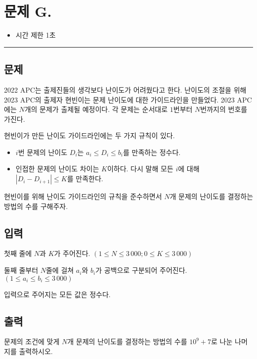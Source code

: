 \newpage
\section*{{\Large 문제 G.} }

\begin{itemize}
    \item 시간 제한 \tabto{2cm} 1초
\end{itemize}

\hrule

\subsection*{문제}

2022 APC는 출제진들의 생각보다 난이도가 어려웠다고 한다. 난이도의 조절을 위해 2023 APC의 출제자 현빈이는 문제 난이도에 대한 가이드라인을 만들었다. 2023 APC에는 $N$개의 문제가 출제될 예정이다. 각 문제는 순서대로 $1$번부터 $N$번까지의 번호를 가진다.

현빈이가 만든 난이도 가이드라인에는 두 가지 규칙이 있다.

\begin{itemize}
    \item $i$번 문제의 난이도 $D_{i}$는 $a_{i}\leq D_{i}\leq b_{i}$를 만족하는 정수다.
    \item 인접한 문제의 난이도 차이는 $K$이하다. 다시 말해 모든 $i$에 대해 $|D_{i}-D_{i+1}|\leq K$를 만족한다.
\end{itemize}

현빈이를 위해 난이도 가이드라인의 규칙을 준수하면서 $N$개 문제의 난이도를 결정하는 방법의 수를 구해주자.

\subsection*{입력}

첫째 줄에 $N$과 $K$가 주어진다. $(1\leq N\leq 3\,000; 0\leq K \leq 3\,000)$

둘째 줄부터 $N$줄에 걸쳐 $a_{i}$와 $b_{i}$가 공백으로 구분되어 주어진다. $(1\leq a_{i} \leq b_{i} \leq 3\,000)$

입력으로 주어지는 모든 값은 정수다.

\subsection*{출력}

문제의 조건에 맞게 $N$개 문제의 난이도를 결정하는 방법의 수를 $10^{9}+7$로 나눈 나머지를 출력하시오.

